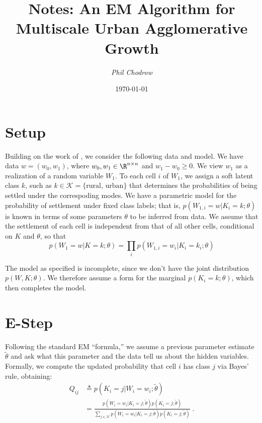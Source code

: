 \documentclass[english]{scrartcl}
\title{Notes: An EM Algorithm for Multiscale Urban Agglomerative Growth}
\author{\emph{Phil Chodrow}}
\date{\today}
\begin{document}

\maketitle

\section{Setup}
	
	Building on the work of \cite{Rybski2013}, we consider the following data and model. 
	We have data $w = (w_0, w_1)$, where $w_0, w_1 \in \R^{n \times n}$ and $w_1 - w_0 \geq 0$. 
	We view $w_1$ as a realization of a random variable $W_1$. 
	To each cell $i$ of $W_1$, we assign a soft latent class $k$, such as $k \in \mathcal{K} = \{\text{rural, urban}\}$ that determines the probabilities of being settled under the correspoding modes. 
	We have a parametric model for the probability of settlement under fixed class labels; that is, $p(W_{1,i} = w | K_i = k; \theta)$ is known in terms of some parameters $\theta$ to be 	inferred from data. 
	We assume that the settlement of each cell is independent from that of all other cells, conditional on $K$ and $\theta$, so that 
	\begin{equation*}
		p(W_1 = w | K = k; \theta) = \prod_{i} p(W_{1,i} = w_i | K_i = k_i; \theta)
	\end{equation*}

	The model as specified is incomplete, since we don't have the joint distribution $p(W, K; \theta)$. 
	We therefore assume a form for the marginal $p(K_i = k; \theta)$, which then completes the model. 

\section{E-Step}

	Following the standard EM ``formula,'' we assume a previous parameter estimate $\tilde{\theta}$ and ask what this parameter and the data tell us about the hidden variables. 
	Formally, we compute the updated probability that cell $i$ has class $j$ via Bayes' rule, obtaining: 
	\begin{align*}
		Q_{ij} &\triangleq p(K_i = j | W_i = w_i; \tilde{\theta}) \\ 
		 &= \frac{p(W_i = w_i | K_i = j; \tilde{\theta}) p(K_i = j; \tilde{\theta})}{\sum_{j \in \mathcal{K}} p(W_i = w_i | K_i = j; \tilde{\theta}) p(K_i = j; \tilde{\theta})}\;. 
	\end{align*}
\end{document}
